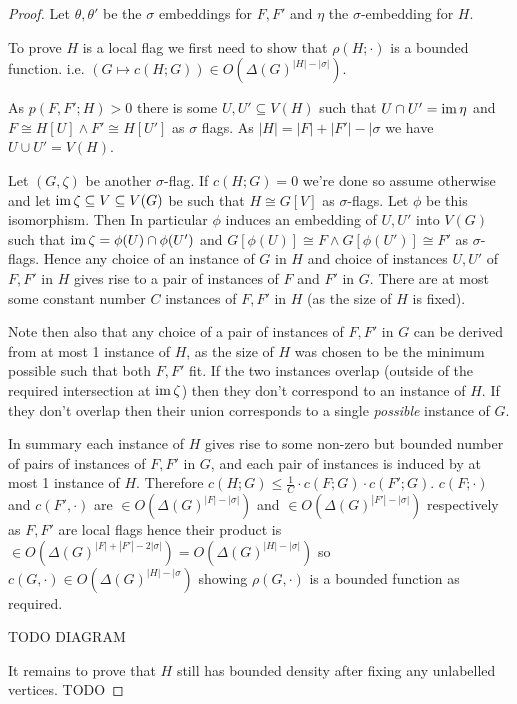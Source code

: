 \begin{proof}
    Let $\theta,\theta'$ be the $\sigma$ embeddings for $F, F'$ and $\eta$ the
    $\sigma$-embedding for $H.$

    To prove $H$ is a local flag we first need to show that $\rho(H; \cdot)$ is a bounded function.
    i.e. $(G \mapsto c(H; G)) \in O(\Delta(G)^{|H|-|\sigma|}).$

    As $p(F, F'; H) > 0$ there is some $U, U'\subseteq V(H)$ such that $U\cap U'=\operatorname{im}\eta$ and
    $F \cong H[U] \land F'\cong H[U']$ as $\sigma$ flags. As $|H|=|F|+|F'|-|\sigma$ we
    have $U \cup U' = V(H)$.

    Let $(G, \zeta)$ be another $\sigma$-flag. If $c(H; G) = 0$ we're done so assume otherwise and
    let $\operatorname{im}\zeta \subseteq V\subseteq V(G)$ be such that $H \cong G[V]$ as $\sigma$-flags. Let
    $\phi$ be this isomorphism. Then In particular $\phi$ induces an embedding of $U, U'$ into
    $V(G)$ such that $\operatorname{im}\zeta = \phi(U) \cap \phi(U')$ and $G[\phi(U)] \cong F\land G[\phi(U')]
    \cong F'$ as $\sigma$-flags.  Hence any choice of an instance of $G$ in $H$ and choice of
    instances $U, U'$ of $F, F'$ in $H$ gives rise to a pair of instances of $F$ and $F'$ in $G.$
    There are at most some constant number $C$ instances of $F, F'$ in $H$ (as the size of $H$ is
    fixed).

    Note then also that any choice of a pair of instances of $F, F'$ in $G$ can be derived from at
    most 1 instance of $H$, as the size of $H$ was chosen to be the minimum possible such that both
    $F,F'$ fit. If the two instances overlap (outside of the required intersection at $\operatorname{im}\zeta$)
    then they don't correspond to an instance of $H.$ If they don't overlap then their
    union corresponds to a single \textit{possible} instance of $G.$

    In summary each instance of $H$ gives rise to some non-zero but bounded number of pairs of
    instances of $F, F'$ in $G$, and each pair of instances is induced by at most 1 instance of $H.$
    Therefore $c(H; G) \leq \frac{1}{C}\cdot c(F; G)\cdot c(F'; G).$ $c(F; \cdot)$ and
    $c(F', \cdot)$ are $\in O(\Delta(G)^{|F|-|\sigma|})$ and $\in O(\Delta(G)^{|F'|-|\sigma|})$
    respectively as $F,F'$ are local flags hence their product is
    $\in O(\Delta(G)^{|F|+|F'|-2|\sigma|}) = O(\Delta(G)^{|H|-|\sigma|})$ so
    $c(G, \cdot) \in O(\Delta(G)^{|H|-|\sigma})$ showing $\rho(G, \cdot)$ is a bounded function as
    required.

    TODO DIAGRAM

    It remains to prove that $H$ still has bounded density after fixing any unlabelled vertices.
    TODO
\end{proof}

